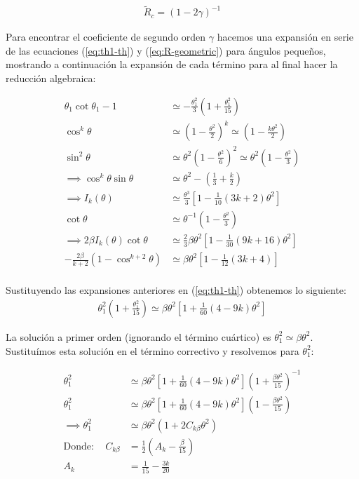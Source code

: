 \begin{align}
  \tilde{R}_c = \left(1 - 2\gamma\right)^{-1}
\end{align}

Para encontrar el coeficiente de segundo orden $\gamma$ hacemos una expansión en serie de las ecuaciones (\ref{eq:th1-th}) y
(\ref{eq:R-geometric}) para ángulos pequeños, mostrando a continuación la expansión de cada término para al final hacer la
reducción algebraica:

\begin{align}
  \theta_1\cot\theta_1 -1 &\simeq -\frac{\theta^2_1}{3}\left(1 + \frac{\theta^2_1}{15}\right) \\
  \cos^k\theta &\simeq \left(1 - \frac{\theta^2}{2}\right)^k \simeq \left(1 - \frac{k\theta^2}{2}\right) \\
  \sin^2\theta &\simeq \theta^2\left(1 - \frac{\theta^2}{6}\right)^2 \simeq \theta^2\left(1 - \frac{\theta^2}{3}\right)\\
  \implies \cos^k\theta\sin\theta &\simeq \theta^2 - \left(\frac{1}{3} + \frac{k}{2}\right) \\
  \implies I_k(\theta) &\simeq \frac{\theta^3}{3}\left[1 - \frac{1}{10}\left(3k + 2\right)\theta^2\right] \\
  \cot\theta &\simeq \theta^{-1}\left(1 - \frac{\theta^2}{3}\right) \\
  \implies 2\beta I_k(\theta)\cot\theta &\simeq \frac{2}{3}\beta\theta^2\left[1 - \frac{1}{30}\left(9k + 16\right)\theta^2\right] \\
  -\frac{2\beta}{k+2}\left(1 - \cos^{k+2}\theta\right) &\simeq \beta\theta^2\left[1 - \frac{1}{12}\left(3k+4\right)\right] \\
\end{align}

Sustituyendo las expansiones anteriores en (\ref{eq:th1-th}) obtenemos lo siguiente:
\begin{align}
  \theta^2_1\left(1 + \frac{\theta^2_1}{15}\right) \simeq \beta\theta^2\left[1 + \frac{1}{60}\left(4 - 9k\right)\theta^2\right]
  \label{eq:th1-th-approx}
\end{align}

La solución a primer orden (ignorando el término cuártico) es $\theta^2_ 1 \simeq \beta\theta^2$. Sustituímos esta solución en el
término correctivo y resolvemos para $\theta^2_1$:

\begin{align}
  \theta^2_1 &\simeq \beta\theta^2\left[1 + \frac{1}{60}\left(4 - 9k\right)\theta^2\right]\left(1 + \frac{\beta\theta^2}{15}\right)^{-1} \\
  \theta^2_1 &\simeq \beta\theta^2\left[1 + \frac{1}{60}\left(4 - 9k\right)\theta^2\right]\left(1 - \frac{\beta\theta^2}{15}\right) \\
  \implies \theta^2_1 &\simeq \beta\theta^2\left(1 + 2C_{k\beta}\theta^2\right) \\
  \mathrm{Donde:\quad}C_{k\beta} &= \frac{1}{2}\left(A_k - \frac{\beta}{15}\right) \\
  A_k &= \frac{1}{15} - \frac{3k}{20}
\end{align}

